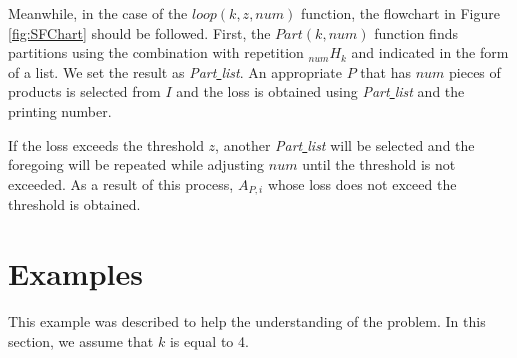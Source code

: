Meanwhile, in the case of the ${loop}(k, z, num)$ function, the flowchart in Figure \ref{fig:SFChart} should be followed.
First, the ${Part}(k, num)$ function finds partitions using the combination with repetition $_{num}H_{k}$ 
and indicated in the form of a list. 
We set the result as {\it Part\underline{ }list}. 
An appropriate $P$ that has $num$ pieces of products is selected from $I$ and the loss is obtained using {\it Part\underline{ }list} and the printing number.

If the loss exceeds the threshold $z$, another {\it Part\underline{ }list} will be selected and the foregoing will be repeated 
while adjusting $num$ until the threshold is not exceeded.
As a result of this process, $A_{P,i}$ whose loss does not exceed the threshold is obtained.%



\section{Examples}\label{sec:Exam}
This example was described to help the understanding of the problem. In this section, we assume that $k$ is equal to 4.

